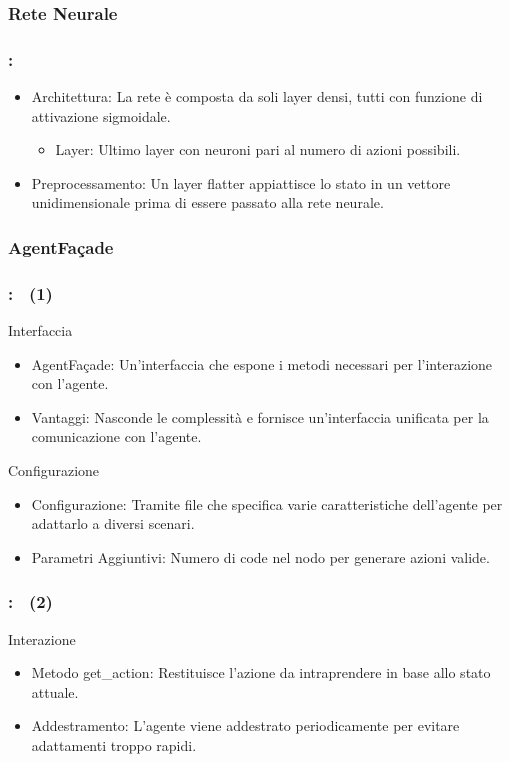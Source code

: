 \documentclass[compress]{beamer}
\begin{document}
\subsubsection*{Rete Neurale}
\begin{frame}
    \frametitle{\subsecname: \subsubsecname}
    \begin{itemize}
        \item Architettura: La rete è composta da soli layer densi, tutti con funzione di attivazione sigmoidale.
        \begin{itemize}
            \item Layer: Ultimo layer con neuroni pari al numero di azioni possibili.
        \end{itemize}
        \item Preprocessamento: Un layer flatter appiattisce lo stato in un vettore unidimensionale prima di essere passato alla rete neurale.
    \end{itemize}
\end{frame}

\subsubsection{AgentFaçade}
\begin{frame}
    \frametitle{\subsecname: \subsubsecname\ (1)}
    Interfaccia
    \begin{itemize}
        \item AgentFaçade: Un'interfaccia che espone i metodi necessari per l'interazione con l'agente.
        \item Vantaggi: Nasconde le complessità e fornisce un'interfaccia unificata per la comunicazione con l'agente.
    \end{itemize}
    Configurazione
    \begin{itemize}
        \item Configurazione: Tramite file che specifica varie caratteristiche dell'agente per adattarlo a diversi scenari.
        \item Parametri Aggiuntivi: Numero di code nel nodo per generare azioni valide.
    \end{itemize}
\end{frame}

\begin{frame}
    \frametitle{\subsecname: \subsubsecname\ (2)}
    Interazione
    \begin{itemize}
        \item Metodo get\_action: Restituisce l'azione da intraprendere in base allo stato attuale.
        \item Addestramento: L'agente viene addestrato periodicamente per evitare adattamenti troppo rapidi.
    \end{itemize}
\end{frame}
\end{document}
